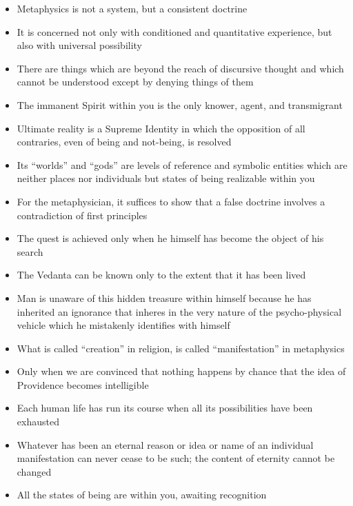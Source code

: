 \begin{itemize}
\item Metaphysics is not a system, but a consistent doctrine 
\item It is concerned not only with conditioned and quantitative experience, but also with universal possibility 
\item There are things which are beyond the reach of discursive thought and which cannot be understood except by denying things of them 
\item The immanent Spirit within you is the only knower, agent, and transmigrant 
\item Ultimate reality is a Supreme Identity in which the opposition of all contraries, even of being and not-being, is resolved 
\item Its “worlds” and “gods” are levels of reference and symbolic entities which are neither places nor individuals but states of being realizable within you 
\item For the metaphysician, it suffices to show that a false doctrine involves a contradiction of first principles 
\item The quest is achieved only when he himself has become the object of his search 
\item The Vedanta can be known only to the extent that it has been lived 
\item Man is unaware of this hidden treasure within himself because he has inherited an ignorance that inheres in the very nature of the psycho-physical vehicle which he mistakenly identifies with himself 
\item What is called “creation” in religion, is called “manifestation” in metaphysics 
\item Only when we are convinced that nothing happens by chance that the idea of Providence becomes intelligible 
\item Each human life has run its course when all its possibilities have been exhausted 
\item Whatever has been an eternal reason or idea or name of an individual manifestation can never cease to be such; the content of eternity cannot be changed 
\item All the states of being are within you, awaiting recognition 
\end{itemize}


